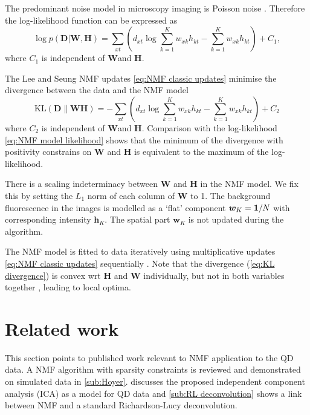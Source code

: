 The predominant noise model in microscopy imaging is Poisson noise \cite{PawleyHandbook2006}. Therefore the log-likelihood function can be expressed as
%
\begin{equation}
	\log p(\bm{D}|\bm{W},\bm{H})=\sum_{xt}\left(d_{xt}\log\sum_{k=1}^{K}w_{xk}h_{kt}-\sum_{k=1}^{K}w_{xk}h_{kt}\right)+C_{1},
	\label{eq:NMF model likelihood}
\end{equation}
%
where $C_{1}$ is independent of $\bm{W}$and $\bm{H}$. 

The Lee and Seung NMF updates \autoref{eq:NMF classic updates} minimise the divergence between the data and the NMF model
%
\begin{equation}
	\mbox{KL}(\bm{D}\parallel\bm{WH})=-\sum_{xt}\left(d_{xt}\log\sum_{k=1}^{K}w_{xk}h_{kt}-\sum_{k=1}^{K}w_{xk}h_{kt}\right)+C_{2}
	\label{eq:KL divergence}
\end{equation}
%
where $C_{2}$ is independent of $\bm{W}$and $\bm{H}$. Comparison with the log-likelihood \autoref{eq:NMF model likelihood} shows that the minimum of the divergence with positivity constrains on $\bm{W}$ and $\bm{H}$ is equivalent to the maximum of the log-likelihood. 

There is a scaling indeterminacy between $\bm{W}$ and $\bm{H}$ in the NMF model. We fix this by setting the $L_1$ norm of each column of $\bm{W}$ to 1. The background fluorescence in the images is modelled as a `flat' component $\bm{w}_{K} = \mathbf{1}/N$ with corresponding intensity $\bm{h}_{K}$. The spatial part $\bm{w}_{K}$ is not updated during the algorithm. 

The NMF model is fitted to data iteratively using multiplicative updates \autoref{eq:NMF classic updates} sequentially \cite{Lee2001}. Note that the divergence (\autoref{eq:KL divergence}) is convex wrt $\bm{H}$ and $\bm{W}$ individually, but not in both variables together \cite{Lee2001}, leading to local optima.


\clearpage
\section{Related work \label{sec:NMF related}}
This section points to published work relevant to NMF application to the QD data. A NMF algorithm with sparsity constraints is reviewed and demonstrated on simulated data in \autoref{sub:Hoyer}.  discusses the proposed independent component analysis (ICA) as a model for QD data and \autoref{sub:RL deconvolution} shows a link between NMF and a standard Richardson-Lucy deconvolution.

